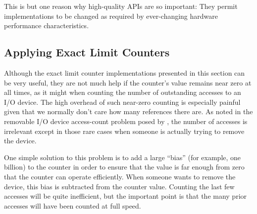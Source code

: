 \QuickQuizEnd

This is but one reason why high-quality APIs are so important:
They permit implementations to be changed as required by ever-changing
hardware performance characteristics.

\QuickQuizEnd

\subsection{Applying Exact Limit Counters}
\label{sec:count:Applying Exact Limit Counters}

Although the exact limit counter implementations presented in this
section can be very useful, they are not much help if the counter's value
remains near zero at all times, as it might when counting the number
of outstanding accesses to an I/O device.
The high overhead of such near-zero counting is especially painful
given that we normally don't care how many references there are.
As noted in the removable I/O device access-count problem posed by
\QuickQuizRef{\QcountQIOcnt},
the number of accesses is irrelevant except in those rare cases when
someone is actually trying to remove the device.

One simple solution to this problem is to add a large ``bias''
(for example, one billion) to the
counter in order to ensure that the value is far enough from zero that
the counter can operate efficiently.
When someone wants to remove the device, this bias is subtracted from
the counter value.
Counting the last few accesses will be quite inefficient,
but the important point is that the many prior accesses will have been
counted at full speed.

